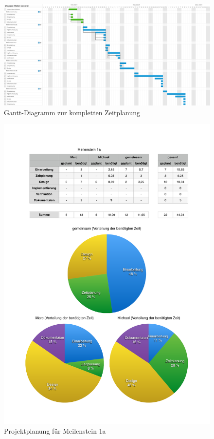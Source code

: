 \documentclass[ngerman,fontsize=12pt , paper=a4 , twoside=false , DIV12 , BCOR=1cm ,
numbers=enddot , listof=totoc , bibliography=totoc , index=totoc ,
headings=small , headlines=1.5 , final]{scrbook}
\begin{document}
\begin{figure}
\begin{center}
\includegraphics[scale=.3,angle=90]{../../Planning/Gantt-Diagramm.png}
\end{center}
\caption{Gantt-Diagramm zur kompletten Zeitplanung}
\label{fig:gantt}
\end{figure}

\begin{figure}[htbp]
\centering
\includegraphics{../../Planning/Planung_Meilenstein1a.pdf}
\caption{Projektplanung für Meilenstein 1a\label{fig:projektplanung}}
\end{figure}
\end{document}
